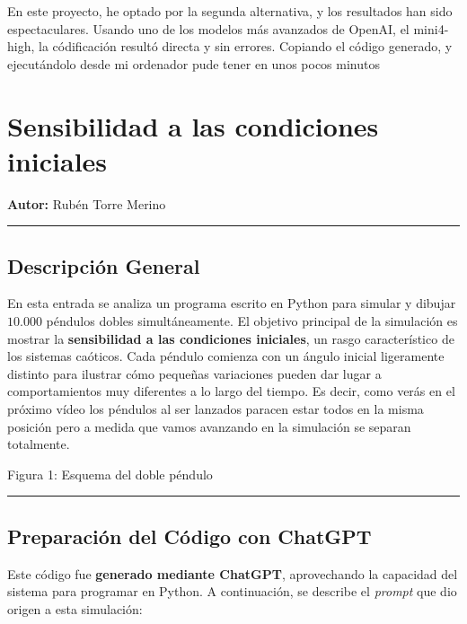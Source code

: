 \documentclass[
  10pt,
  a4paper,
  DIV=11,
  numbers=noendperiod,
  open=any]{scrreprt}
\numberwithin{equation}{chapter}
\numberwithin{equation}{chapter}
\renewcommand{\[}{\begin{equation}}
\renewcommand{\]}{\end{equation}}
\begin{document}
En este proyecto, he optado por la segunda alternativa, y los resultados
han sido espectaculares. Usando uno de los modelos más avanzados de
OpenAI, el mini4-high, la códificación resultó directa y sin errores.
Copiando el código generado, y ejecutándolo desde mi ordenador pude
tener en unos pocos minutos


\chapter{Sensibilidad a las condiciones
iniciales}\label{sensibilidad-a-las-condiciones-iniciales}

\textbf{Autor:} Rubén Torre Merino

\begin{center}\rule{0.5\linewidth}{0.5pt}\end{center}

\section{Descripción General}\label{descripciuxf3n-general}

En esta entrada se analiza un programa escrito en Python para simular y
dibujar \(10.000\) péndulos dobles simultáneamente. El objetivo
principal de la simulación es mostrar la \textbf{sensibilidad a las
condiciones iniciales}, un rasgo característico de los sistemas
caóticos. Cada péndulo comienza con un ángulo inicial ligeramente
distinto para ilustrar cómo pequeñas variaciones pueden dar lugar a
comportamientos muy diferentes a lo largo del tiempo. Es decir, como
verás en el próximo vídeo los péndulos al ser lanzados paracen estar
todos en la misma posición pero a medida que vamos avanzando en la
simulación se separan totalmente.

Figura 1: Esquema del doble péndulo

\begin{center}\rule{0.5\linewidth}{0.5pt}\end{center}

\section{Preparación del Código con
ChatGPT}\label{preparaciuxf3n-del-cuxf3digo-con-chatgpt}

Este código fue \textbf{generado mediante ChatGPT}, aprovechando la
capacidad del sistema para programar en Python. A continuación, se
describe el \emph{prompt} que dio origen a esta simulación:
\end{document}
